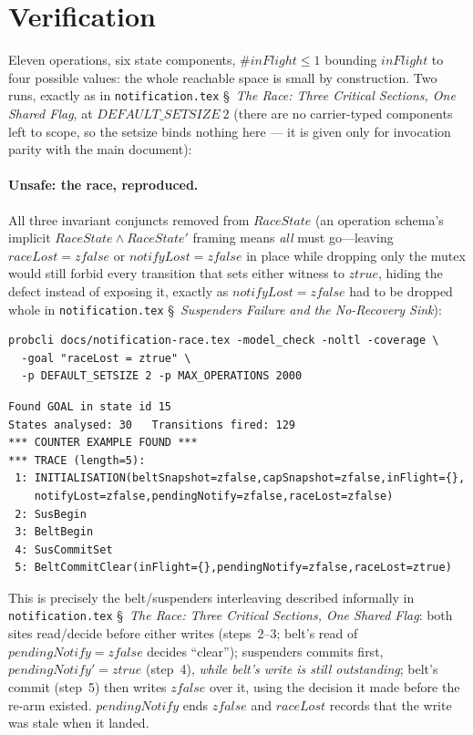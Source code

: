 \documentclass[a4paper,10pt,fleqn]{article}
\begin{document}
\section{Verification}

Eleven operations, six state components, $\# inFlight \leq 1$ bounding
$inFlight$ to four possible values: the whole reachable space is small
by construction.  Two runs, exactly as in \texttt{notification.tex}
\S~\emph{The Race: Three Critical Sections, One Shared Flag}, at $DEFAULT\_SETSIZE~2$ (there are no carrier-typed
components left to scope, so the setsize binds nothing here --- it is
given only for invocation parity with the main document):

\paragraph{Unsafe: the race, reproduced.}  All three invariant conjuncts
removed from $RaceState$ (an operation schema's implicit
$RaceState \land RaceState'$ framing means \emph{all} must go---leaving
$raceLost = zfalse$ or $notifyLost = zfalse$ in place while dropping
only the mutex would still forbid every transition that sets either
witness to $ztrue$, hiding the defect instead of exposing it, exactly
as $notifyLost = zfalse$ had to be dropped whole in
\texttt{notification.tex} \S~\emph{Suspenders Failure and the
No-Recovery Sink}):

\begin{verbatim}
probcli docs/notification-race.tex -model_check -noltl -coverage \
  -goal "raceLost = ztrue" \
  -p DEFAULT_SETSIZE 2 -p MAX_OPERATIONS 2000
\end{verbatim}

\begin{verbatim}
Found GOAL in state id 15
States analysed: 30   Transitions fired: 129
*** COUNTER EXAMPLE FOUND ***
*** TRACE (length=5):
 1: INITIALISATION(beltSnapshot=zfalse,capSnapshot=zfalse,inFlight={},
    notifyLost=zfalse,pendingNotify=zfalse,raceLost=zfalse)
 2: SusBegin
 3: BeltBegin
 4: SusCommitSet
 5: BeltCommitClear(inFlight={},pendingNotify=zfalse,raceLost=ztrue)
\end{verbatim}

This is precisely the belt/suspenders interleaving described informally
in \texttt{notification.tex} \S~\emph{The Race: Three Critical Sections, One Shared Flag}: both sites read/decide
before either writes (steps~2--3; belt's read of $pendingNotify =
zfalse$ decides ``clear''); suspenders commits first,
$pendingNotify' = ztrue$ (step~4), \emph{while belt's write is still
outstanding}; belt's commit (step~5) then writes $zfalse$ over it,
using the decision it made before the re-arm existed.  $pendingNotify$
ends $zfalse$ and $raceLost$ records that the write was stale when it
landed.
\end{document}
